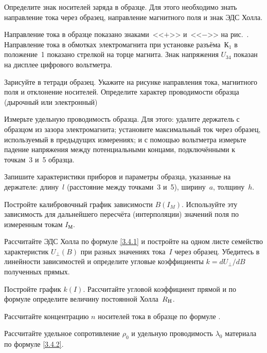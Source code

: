 \begin{lab:task}
\item Определите знак носителей заряда в образце. Для этого необходимо знать
направление тока через образец, направление магнитного поля и знак ЭДС Холла.

Направление тока в образце показано знаками~<<$+$>> и~<<$-$>> на
рис.~. Направление тока в обмотках электромагнита при 
установке разъёма~К$_1$ в положение~1 показано стрелкой на торце магнита.
Знак напряжения $U_{34}$ показан на дисплее цифрового вольтметра.

Зарисуйте в тетради образец. Укажите на рисунке направления тока, магнитного
поля и отклонение носителей. Определите характер проводимости образца
(дырочный или электронный)

\item Измерьте удельную проводимость образца. Для этого: 
удалите держатель с образцом из зазора электромагнита;
установите максимальный ток через образец, используемый в предыдущих измерениях;
и с помощью вольтметра измерьте падение напряжения между потенциальными концами, 
подключёнными к точкам~3 и~5 образца.

\item Запишите характеристики приборов и параметры образца, указанные на держателе:
длину~$l$ (расстояние между точками~3 и~5), ширину~$a$, толщину~$h$.



\item Постройте калибровочный график зависимости $B(I_{M})$. 
Используйте эту зависимость для дальнейшего пересчёта (интерполяции)
значений поля по измеренным токам $I_{М}$.


\item Рассчитайте ЭДС Холла по формуле \eqref{3.4.1} и постройте на одном листе
семейство характеристик $U_{\perp}(B)$ при разных значениях тока~$I$ через
образец. Убедитесь в линейности зависимостей и определите угловые 
коэффициенты $k=dU_{\perp}/dB$ полученных прямых.

\item Постройте график $k(I)$. Рассчитайте угловой коэффициент прямой 
и по формуле  определите величину постоянной Холла~$R_{\rm H}$.

\item Рассчитайте концентрацию $n$ носителей тока в образце по формуле
.

\item Рассчитайте удельное сопротивление $\rho_0$ и удельную 
проводимость $\lambda_0$ материала по формуле \eqref{3.4.2}.


\end{lab:task}
